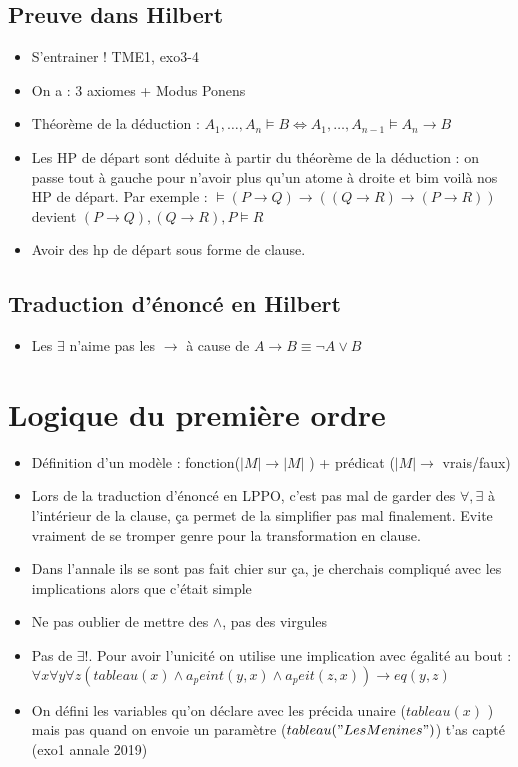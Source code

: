 \documentclass{article}
\theoremstyle{plain}%
\theoremstyle{definition}
\theoremstyle{remark}
\begin{document}
\subsection{Preuve dans Hilbert}
\begin{itemize}
    \item S'entrainer ! TME1, exo3-4
    \item On a : 3 axiomes + Modus Ponens
    \item Théorème de la déduction : $ A_1, \dots, A_n \models B \Leftrightarrow A_1, \dots, A_{n-1} \models A_n \to B$ 
    \item Les HP de départ sont déduite à partir du théorème de la déduction : on passe tout à gauche pour n'avoir plus qu'un atome à droite et bim voilà nos HP de départ. Par exemple : $ \models (P \to Q) \to ((Q \to R) \to (P \to R)) $ devient $ (P \to Q), (Q \to R), P \models R  $ 
    \item Avoir des hp de départ sous forme de clause.
\end{itemize}

\subsection{Traduction d'énoncé en Hilbert}
\begin{itemize}
    \item Les $ \exists  $ n'aime pas les $ \rightarrow  $ à cause de $ A \to B \equiv \neg A \vee B $
\end{itemize}

\section{Logique du première ordre}
\begin{itemize}
    \item Définition d'un modèle : fonction($ \left| M \right| \to \left| M \right|  $ ) + prédicat ($ \left| M \right| \to  $ vrais/faux)
    \item Lors de la traduction d'énoncé en LPPO, c'est pas mal de garder des $ \forall, \exists  $ à l'intérieur de la clause, ça permet de la simplifier pas mal finalement. Evite vraiment de se tromper genre pour la transformation en clause.
    \item Dans l'annale ils se sont pas fait chier sur ça, je cherchais compliqué avec les implications alors que c'était simple 
    \item Ne pas oublier de mettre des $ \wedge  $, pas des virgules
    \item Pas de $ \exists ! $. Pour avoir l'unicité on utilise une implication avec égalité au bout : $ \forall x \forall y \forall z (tableau(x) \wedge a_peint(y,x) \wedge a_peit(z,x)) \to eq(y,z) $ 
    \item On défini les variables qu'on déclare avec les précida unaire ($ tableau(x) $ ) mais pas quand on envoie un paramètre ($ tableau("LesMenines") $) t'as capté (exo1 annale 2019)
\end{itemize}
\end{document}
